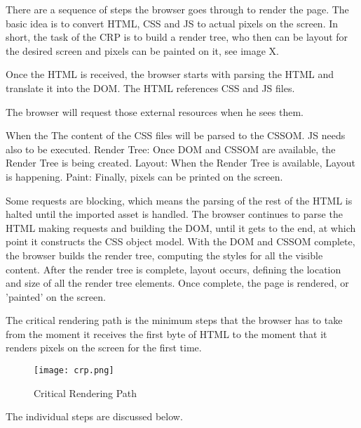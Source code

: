 There are a sequence of steps the browser goes through to render the page.
The basic idea is to convert HTML, CSS and JS to actual pixels on the screen.
In short, the task of the CRP is to build a render tree, who then can be layout for the desired screen and pixels can be painted on it, see image X.

Once the HTML is received, the browser starts with parsing the HTML and translate it into the DOM.
The HTML references CSS and JS files.

The browser will request those external resources when he sees them.


When the The content of the CSS files will be parsed to the CSSOM.
JS needs also to be executed.
Render Tree: Once DOM and CSSOM are available, the Render Tree is being created.
Layout: When the Render Tree is available, Layout is happening.
Paint: Finally, pixels can be printed on the screen.



Some requests are blocking, which means the parsing of the rest of the HTML is halted until the imported asset is handled. The browser continues to parse the HTML making requests and building the DOM, until it gets to the end, at which point it constructs the CSS object model. With the DOM and CSSOM complete, the browser builds the render tree, computing the styles for all the visible content. After the render tree is complete, layout occurs, defining the location and size of all the render tree elements. Once complete, the page is rendered, or 'painted' on the screen.

The critical rendering path is the minimum steps that the browser has to take from the moment it receives the first byte of HTML to the moment that it renders pixels on the screen for the first time.


\begin{figure}[h!]
\begin{center}
\texttt{[image: crp.png]}
\caption{Critical Rendering Path}
\label{img:crp}
\end{center}
\end{figure}

The individual steps are discussed below.






